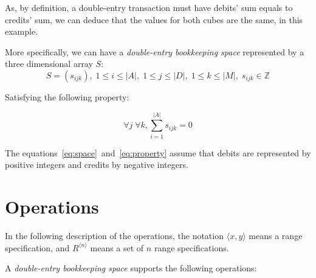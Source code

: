 \documentclass{article}
\begin{document}
As, by definition, a double-entry transaction must have debits' sum
equals to credits' sum, we can deduce that the values for both
cubes are the same, in this example.

More specifically, we can have a \emph{double-entry bookkeeping space} 
represented by a three dimensional array $S$:
\begin{equation}
	\label{eq:space}
	S = \left(s_{ijk}\right), 
	\; 1 \leq i \leq |A|, \; 1 \leq j \leq |D|, \; 1 \leq k \leq |M|, 
	\; s_{ijk} \in \mathbb{Z}
\end{equation}

Satisfying the following property:

\begin{equation}
	\label{eq:property}
	\forall j \; \forall k, \sum_{i=1}^{|A|}{s_{ijk}} = 0
\end{equation}

The equations~\eqref{eq:space}~and~\eqref{eq:property}
assume that debits are represented by positive integers
and credits by negative integers.

\section{Operations}

In the following description of the operations, the notation $\langle x, y \rangle$ means
a range specification, and $R^{\langle n \rangle}$ means a set of $n$
range specifications.

A \emph{double-entry bookkeeping space} supports the following operations:
\end{document}
